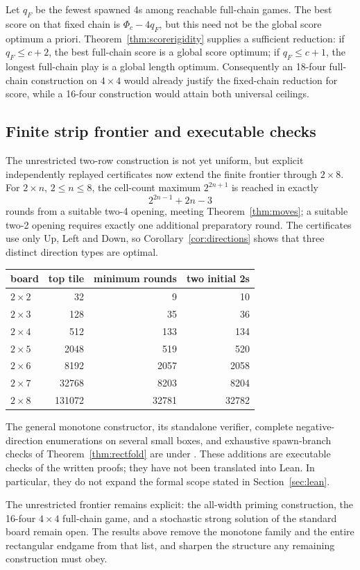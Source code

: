 Let $q_F$ be the fewest spawned 4s among reachable full-chain games.  The
best score on that fixed chain is $\Phi_c-4q_F$, but this need not be the
global score optimum a priori.  Theorem~\ref{thm:scorerigidity} supplies a
sufficient reduction: if $q_F\le c+2$, the best full-chain score is a
global score optimum; if $q_F\le c+1$, the longest full-chain play is a
global length optimum.  Consequently an 18-four full-chain construction
on $4\times4$ would already justify the fixed-chain reduction for score,
while a 16-four construction would attain both universal ceilings.

\subsection{Finite strip frontier and executable checks}

The unrestricted two-row construction is not yet uniform, but explicit
independently replayed certificates now extend the finite frontier through
$2\times8$.  For $2\times n$, $2\le n\le8$, the cell-count maximum
$2^{2n+1}$ is reached in exactly
\[
 2^{2n-1}+2n-3
\]
rounds from a suitable two-4 opening, meeting Theorem~\ref{thm:moves}; a
suitable two-2 opening requires exactly one additional preparatory round.
The certificates use only Up, Left and Down, so Corollary~\ref{cor:directions}
shows that three distinct direction types are optimal.

\begin{center}\small
\begin{tabular}{@{}lrrr@{}}
\toprule
board & top tile & minimum rounds & two initial 2s\\
\midrule
$2\times2$ & 32 & 9 & 10\\
$2\times3$ & 128 & 35 & 36\\
$2\times4$ & 512 & 133 & 134\\
$2\times5$ & 2048 & 519 & 520\\
$2\times6$ & 8192 & 2057 & 2058\\
$2\times7$ & 32768 & 8203 & 8204\\
$2\times8$ & 131072 & 32781 & 32782\\
\bottomrule
\end{tabular}
\end{center}

The general monotone constructor, its standalone verifier, complete
negative-direction enumerations on several small boxes, and exhaustive
spawn-branch checks of Theorem~\ref{thm:rectfold} are under
.  These additions are executable checks of the
written proofs; they have not been translated into Lean.  In particular,
they do not expand the formal scope stated in Section~\ref{sec:lean}.

The unrestricted frontier remains explicit: the all-width priming
construction, the 16-four $4\times4$ full-chain game, and a stochastic
strong solution of the standard board remain open.  The results above
remove the monotone family and the entire rectangular endgame from that
list, and sharpen the structure any remaining construction must obey.
